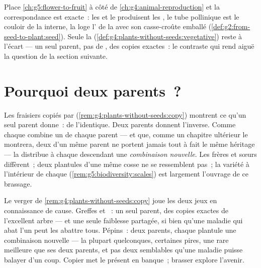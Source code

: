 \begin{remark}\label{rem:g8:sexual-reproduction:plants}
Place \cref{ch:g5:flower-to-fruit} à côté de
\cref{ch:g4:animal-reproduction} et la correspondance est exacte~:
les  et le  produisent les , le tube pollinique
est le couloir de la  interne, la  loge l'
de la  avec son casse-croûte emballé
(\cref{def:g2:from-seed-to-plant:seed}). Seule la  (\cref{def:g4:plants-without-seeds:vegetative}) reste à
l'écart --- un seul parent, pas de , des copies exactes~: le
contraste qui rend aiguë la question de la section suivante.
\end{remark}

\section{Pourquoi deux parents~?}

\begin{proposition}\label{prop:g8:sexual-reproduction:shuffle}
Les fraisiers copiés par 
(\cref{rem:g4:plants-without-seeds:copy}) montrent ce qu'un seul
parent donne~: de l'identique. Deux parents donnent l'inverse. Comme
chaque  combine un  de chaque parent --- et que, comme
un chapitre ultérieur le montrera, deux  d'un même parent ne
portent jamais tout à fait le même héritage --- la  distribue à chaque descendant une \emph{combinaison
nouvelle}. Les frères et sœurs diffèrent~; deux plantules d'une même
cosse ne se ressemblent pas~; la variété à l'intérieur de chaque
 (\cref{rem:g5:biodiversity:scales}) est largement l'ouvrage
de ce brassage.
\end{proposition}
\admitted

\begin{example}\label{ex:g8:sexual-reproduction:bets}
Le verger de \cref{rem:g4:plants-without-seeds:copy} joue les deux
jeux en connaissance de cause. Greffes et ~: un seul parent,
des copies exactes de l'excellent arbre --- et une seule faiblesse
partagée, si bien qu'une maladie qui abat l'un peut les abattre
tous. Pépins~: deux parents, chaque plantule une combinaison
nouvelle --- la plupart quelconques, certaines pires, une rare
meilleure que ses deux parents, et pas deux semblables qu'une
maladie puisse balayer d'un coup. Copier met le présent en banque~;
brasser explore l'avenir.
\end{example}

